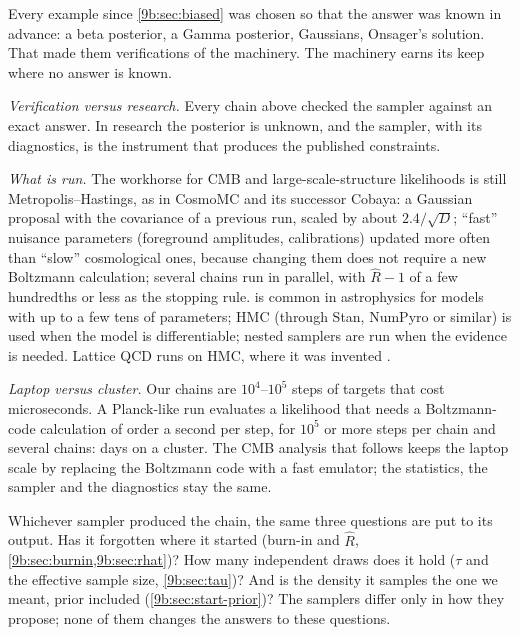 Every example since \cref{9b:sec:biased} was chosen so that the answer was known in advance: a beta
posterior, a Gamma posterior, Gaussians, Onsager's solution. That made them verifications of the
machinery. The machinery earns its keep where no answer is known.

\begin{inpractice}
\emph{Verification versus research.} Every chain above checked the sampler against an exact
answer. In research the posterior is unknown, and the sampler, with its diagnostics, is the
instrument that produces the published constraints.

\emph{What is run.} The workhorse for CMB and large-scale-structure likelihoods is still
Metropolis--Hastings, as in CosmoMC \parencite{LewisBridle2002} and its successor Cobaya: a
Gaussian proposal with the covariance of a previous run, scaled by about $2.4/\sqrt D$; ``fast''
nuisance parameters (foreground amplitudes, calibrations) updated more often than ``slow''
cosmological ones, because changing them does not require a new Boltzmann calculation; several
chains run in parallel, with $\hat R-1$ of a few hundredths or less as the stopping rule. 
is common in astrophysics for models with up to a few tens of parameters; HMC (through Stan, NumPyro
or similar) is used when the model is differentiable; nested samplers are run when the evidence is
needed. Lattice QCD runs on HMC, where it was invented \parencite{Duane1987}.

\emph{Laptop versus cluster.} Our chains are $10^4$--$10^5$ steps of targets that cost
microseconds. A Planck-like run evaluates a likelihood that needs a Boltzmann-code calculation of
order a second per step, for $10^5$ or more steps per chain and several chains: days on a cluster.
The CMB analysis that follows keeps the laptop scale by replacing the Boltzmann code with
a fast emulator; the statistics, the sampler and the diagnostics stay the same.
\end{inpractice}

Whichever sampler produced the chain, the same three questions are put to its output. Has it
forgotten where it started (burn-in and $\hat R$, \cref{9b:sec:burnin,9b:sec:rhat})? How many
independent draws does it hold ($\tau$ and the effective sample size, \cref{9b:sec:tau})? And is
the density it samples the one we meant, prior included (\cref{9b:sec:start-prior})? The samplers
differ only in how they propose; none of them changes the answers to these questions.

